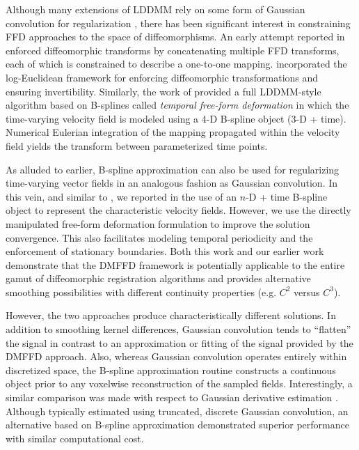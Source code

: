 \documentclass{frontiersSCNS}
\begin{document}


Although many extensions of LDDMM rely on some form of Gaussian
convolution for regularization \citep[e.g.][]{risser2011}, there has
been significant interest in constraining FFD approaches to the space
of diffeomorphisms.  An early attempt reported in \cite{rueckert2006}
enforced diffeomorphic transforms by concatenating multiple FFD
transforms, each of which is constrained to describe a one-to-one
mapping.  \cite{modat2011} incorporated the log-Euclidean framework
for enforcing diffeomorphic transformations and ensuring
invertibility.  Similarly, the work of \cite{de-craene2011} provided a
full LDDMM-style algorithm based on B-splines called {\it temporal
free-form deformation} in which the time-varying velocity field is
modeled using a 4-D B-spline object (3-D + time).  Numerical Eulerian
integration of the mapping propagated within the velocity field yields
the transform between parameterized time points.

As alluded to earlier, B-spline approximation can also be used for
regularizing time-varying vector fields in an analogous fashion as
Gaussian convolution.  In this vein, and similar to
\cite{de-craene2011}, we reported in \cite{tustison2012a,tustison2012}
the use of an $n$-D + time B-spline object to represent the
characteristic velocity fields.  However, we use the directly
manipulated free-form deformation formulation to improve the solution
convergence.  This also facilitates modeling temporal periodicity and
the enforcement of stationary boundaries.  Both this work and our
earlier work \citep{tustison2009} demonstrate that the DMFFD framework
is potentially applicable to the entire gamut of diffeomorphic
registration algorithms and provides alternative smoothing 
possibilities with different continuity properties (e.g. $C^2$
versus $C^3$).  

However, the two approaches produce characteristically
different solutions.  In addition to smoothing kernel differences,
Gaussian convolution tends to ``flatten'' the signal in contrast to an
approximation or fitting of the signal provided by the DMFFD approach.
Also, whereas Gaussian convolution operates entirely within
discretized space, the B-spline approximation routine constructs a
continuous object prior to any voxelwise reconstruction of the sampled
fields.  Interestingly, a similar comparison was made with respect to
Gaussian derivative estimation \citep{bourma2007}.  Although typically
estimated using truncated, discrete Gaussian convolution, an
alternative based on B-spline approximation demonstrated superior
performance with similar computational cost.
\end{document}
